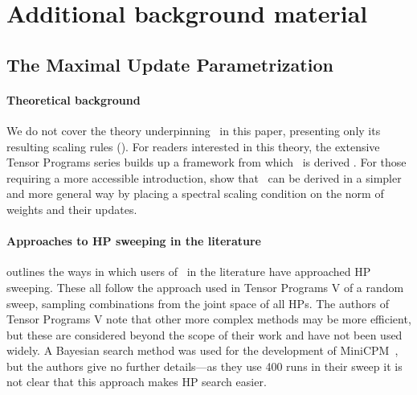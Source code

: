 \section{Additional background material}

\subsection{The Maximal Update Parametrization} \label{app:additional_background:mup}

\paragraph{Theoretical background} We do not cover the theory underpinning \mup\ in this paper, presenting only its resulting scaling rules (). For readers interested in this theory, the extensive Tensor Programs series \citep{Tensor_Programs_I, Tensor_Programs_II, Tensor_Programs_IIb, Tensor_Programs_III, Tensor_Programs_IVb} builds up a framework from which \mup\ is derived \citep{Tensor_Programs_IV}. For those requiring a more accessible introduction, \citep{Spectral_Condition} show that \mup\ can be derived in a simpler and more general way by placing a spectral scaling condition on the norm of weights and their updates.

\paragraph{Approaches to HP sweeping in the literature}

 outlines the ways in which users of \mup\ in the literature have approached HP sweeping. These all follow the approach used in Tensor Programs V of a random sweep, sampling combinations from the joint space of all HPs. The authors of Tensor Programs V note that other more complex methods may be more efficient, but these are considered beyond the scope of their work and have not been used widely. A Bayesian search method was used for the development of MiniCPM~\citep{MiniCPM}, but the authors give no further details---as they use 400 runs in their sweep it is not clear that this approach makes HP search easier.

